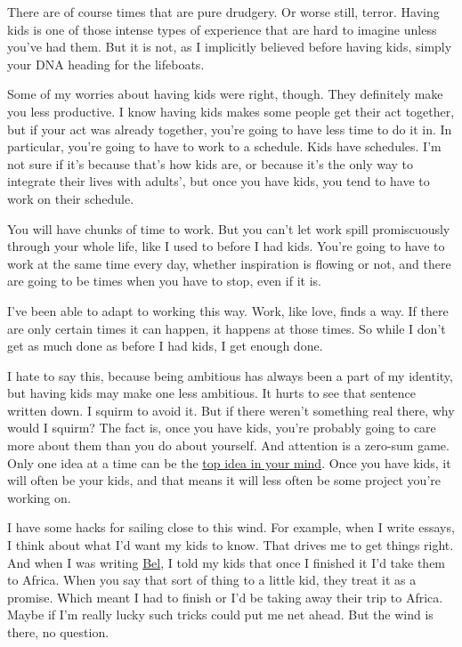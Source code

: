 \documentclass[12pt]{book}
\begin{document}
There are of course times that are pure drudgery. Or worse still,
terror. Having kids is one of those intense types of experience that are
hard to imagine unless you've had them. But it is not, as I implicitly
believed before having kids, simply your DNA heading for the lifeboats.

Some of my worries about having kids were right, though. They definitely
make you less productive. I know having kids makes some people get their
act together, but if your act was already together, you're going to have
less time to do it in. In particular, you're going to have to work to a
schedule. Kids have schedules. I'm not sure if it's because that's how
kids are, or because it's the only way to integrate their lives with
adults', but once you have kids, you tend to have to work on their
schedule.

You will have chunks of time to work. But you can't let work spill
promiscuously through your whole life, like I used to before I had kids.
You're going to have to work at the same time every day, whether
inspiration is flowing or not, and there are going to be times when you
have to stop, even if it is.

I've been able to adapt to working this way. Work, like love, finds a
way. If there are only certain times it can happen, it happens at those
times. So while I don't get as much done as before I had kids, I get
enough done.

I hate to say this, because being ambitious has always been a part of my
identity, but having kids may make one less ambitious. It hurts to see
that sentence written down. I squirm to avoid it. But if there weren't
something real there, why would I squirm? The fact is, once you have
kids, you're probably going to care more about them than you do about
yourself. And attention is a zero-sum game. Only one idea at a time can
be the \href{top.html}{top idea in your mind}. Once you have kids, it
will often be your kids, and that means it will less often be some
project you're working on.

I have some hacks for sailing close to this wind. For example, when I
write essays, I think about what I'd want my kids to know. That drives
me to get things right. And when I was writing \href{bel.html}{Bel}, I
told my kids that once I finished it I'd take them to Africa. When you
say that sort of thing to a little kid, they treat it as a promise.
Which meant I had to finish or I'd be taking away their trip to Africa.
Maybe if I'm really lucky such tricks could put me net ahead. But the
wind is there, no question.
\end{document}
